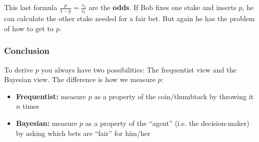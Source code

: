 \documentclass[../main/Notes.tex]{subfiles}
\begin{document}
This last formula $\frac{p}{1-p} = \frac{s_2}{s_1}$ are the \textbf{odds}. If Bob fixes one stake and inserts $p$, he can calculate the other stake needed for a fair bet. But again he has the problem of how to get to $p$.

\subsubsection*{Conclusion}
To derive $p$ you always have two possibilities: The frequentist view and the Bayesian view. The difference is how we measure $p$:
\begin{itemize}
	\item \textbf{Frequentist:} measure $p$ as a property of the coin/thumbtack by throwing it $n$ times
  \item \textbf{Bayesian:} measure $p$ as a property of the ``agent'' (i.e. the decision-maker) by asking which bets are ``fair'' for him/her
\end{itemize}
\end{document}
